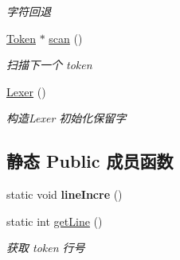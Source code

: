 \begin{DoxyCompactItemize}
\begin{DoxyCompactList}\small\item\em 字符回退 \end{DoxyCompactList}\item 
\hyperlink{class_token}{Token} $\ast$ \hyperlink{class_lexer_a2085b8262f6237de60583375ee2731f4}{scan} ()
\begin{DoxyCompactList}\small\item\em 扫描下一个 token \end{DoxyCompactList}\item 
\mbox{\label{class_lexer_a2752a2b16cc1ffbcb8fc3e82e95bf331}} 
\hyperlink{class_lexer_a2752a2b16cc1ffbcb8fc3e82e95bf331}{Lexer} ()
\begin{DoxyCompactList}\small\item\em 构造\+Lexer 初始化保留字 \end{DoxyCompactList}\end{DoxyCompactItemize}
\subsection*{静态 Public 成员函数}
\begin{DoxyCompactItemize}
\item 
\mbox{\label{class_lexer_a48478c1d6556ce949e7808bf3e2604b7}} 
static void {\bfseries line\+Incre} ()
\item 
\mbox{\label{class_lexer_a0ede40225695d9eb9b42d275584cf8f0}} 
static int \hyperlink{class_lexer_a0ede40225695d9eb9b42d275584cf8f0}{get\+Line} ()
\begin{DoxyCompactList}\small\item\em 获取 token 行号 \end{DoxyCompactList}\end{DoxyCompactItemize}
